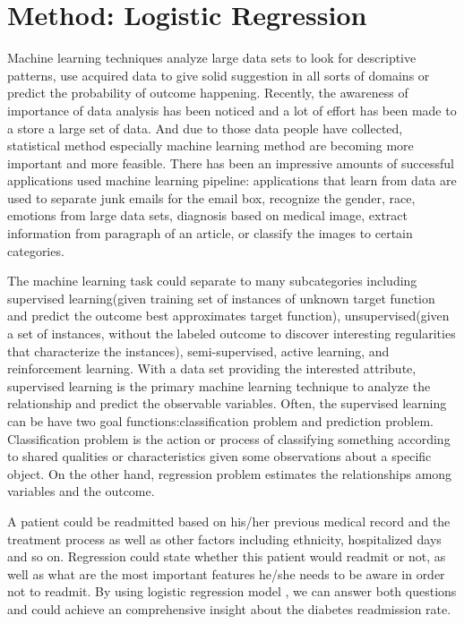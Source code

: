 \documentclass[twoside,11pt]{article}
\begin{document}
\section{Method: Logistic Regression} \label{model}
Machine learning techniques analyze large data sets to look for descriptive patterns, use acquired data to give solid suggestion in all sorts of domains or predict the probability of outcome happening. Recently, the awareness of importance of data analysis has been noticed and a lot of effort has been made to a store a large set of data. And due to those data people have collected, statistical method especially machine learning method are becoming more important and more feasible. There has been an impressive amounts of successful applications used machine learning pipeline: applications that learn from data are used to separate junk emails for the email box, recognize the gender, race, emotions from large data sets, diagnosis based on medical image, extract information from paragraph of an article, or classify the images to certain categories. 

The machine learning task could separate to many subcategories including supervised learning(given training set of instances of unknown target function and predict the outcome best approximates target function), unsupervised(given a set of instances, without the labeled outcome to discover interesting regularities that characterize the instances), semi-supervised, active learning, and reinforcement learning. With a data set providing the interested attribute, supervised learning is the primary machine learning technique to analyze the relationship and predict the observable variables. Often, the supervised learning can be have two goal functions:classification problem and prediction problem. Classification problem is the action or process of classifying something according to shared qualities or characteristics given some observations about a specific object. On the other hand, regression problem estimates the relationships among variables and the outcome. 

A patient could be readmitted based on his/her previous medical record and the treatment process as well as other factors including ethnicity, hospitalized days and so on. Regression could state whether this patient would readmit or not, as well as what are the most important features he/she needs to be aware in order not to readmit. By using logistic regression model , we can answer both questions and could achieve an comprehensive insight about the diabetes readmission rate.
\end{document}
